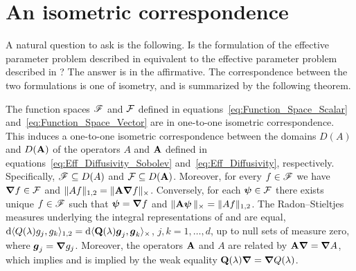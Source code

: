 \documentclass[amsa]{ipart}
\begin{document}
\section{An isometric
  correspondence} \label{app:Isometric_Correspondence} 
%
A natural question to ask is the following. Is the formulation of the
effective parameter problem described in 
equivalent to the effective parameter problem described in
? The answer 
is in the affirmative. The correspondence between the two formulations
is one of isometry, and is summarized by the following theorem.  
%
\begin{theorem}\label{thm:Formulation_Equivalence}
%  
The function spaces $\mathscr{F}$ and $\mathcal{F}$ defined in
equations~\eqref{eq:Function_Space_Scalar}
and~\eqref{eq:Function_Space_Vector} are in one-to-one isometric
correspondence.  This induces a one-to-one isometric correspondence
between the domains $D(A)$ and $D(\mathbf{A})$ of the operators $A$ and $\mathbf{A}$
defined in equations~\eqref{eq:Eff_Diffusivity_Sobolev} 
and~\eqref{eq:Eff_Diffusivity}, respectively. Specifically, $\mathscr{F}\subseteq D(A)$
and $\mathcal{F}\subseteq D(\mathbf{A})$. Moreover, for every
$f\in\mathscr{F}$ we have $\mbox{\boldmath${\nabla}$} f\in\mathcal{F}$ and $\|Af\|_{1,2}=\|\mathbf{A}\mbox{\boldmath${\nabla}$}
f\|_\times$. Conversely, for each $\boldsymbol{\psi}\in\mathcal{F}$ there exists unique $f\in\mathscr{F}$
such that $\boldsymbol{\psi}=\mbox{\boldmath${\nabla}$} f$ and $\|\mathbf{A}\boldsymbol{\psi}\,\|_\times=\|Af\|_{1,2}$. The
Radon--Stieltjes  
measures underlying the integral representations of
 and  are equal,
$\mathrm{d}\langle Q(\lambda)g_j,g_k\rangle_{1,2}=\mathrm{d}\langle\mathbf{Q}(\lambda)\boldsymbol{g}_j,\boldsymbol{g}_k\rangle_\times$, $j,k=1,\ldots,d$, up to
null sets of measure zero, where $\boldsymbol{g}_j=\mbox{\boldmath${\nabla}$} g_j$. Moreover, the 
operators $\mathbf{A}$ and $A$ are related by $\mathbf{A}\mbox{\boldmath${\nabla}$} =\mbox{\boldmath${\nabla}$} A$, which
implies and is implied by the weak equality $\mathbf{Q}(\lambda)\mbox{\boldmath${\nabla}$} =\mbox{\boldmath${\nabla}$}
Q(\lambda)$. 
%
\end{theorem}
%
\end{document}
